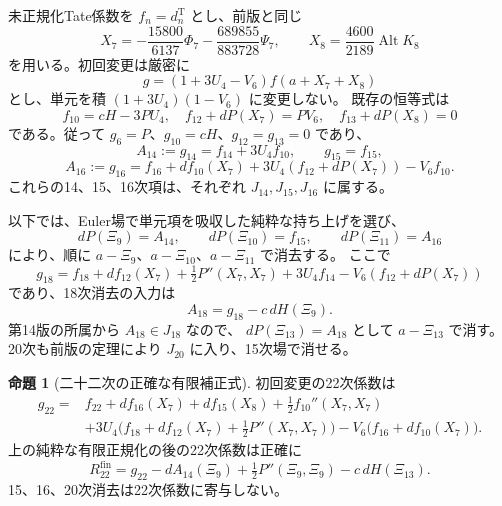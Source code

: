 \documentclass[a4paper,11pt]{ltjsarticle}
\theoremstyle{definition}
\newtheorem{proposition}[theorem]{命題}
\begin{document}
未正規化Tate係数を $f_n=d_n^{\mathrm T}$ とし、前版と同じ
\[
 X_7=-\frac{15800}{6137}\Phi_7-\frac{689855}{883728}\Psi_7,
 \qquad X_8=\frac{4600}{2189}\operatorname{Alt}K_8
\]
を用いる。初回変更は厳密に
\[
 g=(1+3U_4-V_6)f(a+X_7+X_8)
\]
とし、単元を積 $(1+3U_4)(1-V_6)$ に変更しない。
既存の恒等式は
\[
 f_{10}=cH-3PU_4,\quad
 f_{12}+dP(X_7)=PV_6,\quad f_{13}+dP(X_8)=0
\]
である。従って $g_6=P$、$g_{10}=cH$、$g_{12}=g_{13}=0$ であり、
\[
 A_{14}:=g_{14}=f_{14}+3U_4f_{10},\qquad g_{15}=f_{15},
\]
\[
 A_{16}:=g_{16}=f_{16}+df_{10}(X_7)
       +3U_4(f_{12}+dP(X_7))-V_6f_{10}.
\]
これらの14、15、16次項は、それぞれ $J_{14},J_{15},J_{16}$ に属する。

以下では、Euler場で単元項を吸収した純粋な持ち上げを選び、
\[
 dP(\Xi_9)=A_{14},\qquad dP(\Xi_{10})=f_{15},\qquad
 dP(\Xi_{11})=A_{16}
\]
により、順に $a-\Xi_9$、$a-\Xi_{10}$、$a-\Xi_{11}$ で消去する。
ここで
\[
 g_{18}=f_{18}+df_{12}(X_7)+\tfrac12P''(X_7,X_7)
           +3U_4f_{14}-V_6(f_{12}+dP(X_7))
\]
であり、18次消去の入力は
\begin{equation}\label{eq:v16-eighteenth-normalizer-input}
 A_{18}=g_{18}-c\,dH(\Xi_9).
\end{equation}
第14版の所属から $A_{18}\in J_{18}$ なので、
$dP(\Xi_{13})=A_{18}$ として $a-\Xi_{13}$ で消す。
20次も前版の定理により $J_{20}$ に入り、15次場で消せる。

\begin{proposition}[二十二次の正確な有限補正式]
\label{prop:v16-exact-twenty-second-correction}
初回変更の22次係数は
\begin{equation}\label{eq:v16-initial-twenty-second}
\begin{split}
 g_{22}={}&f_{22}+df_{16}(X_7)+df_{15}(X_8)
                +\tfrac12 f_{10}''(X_7,X_7)\\
 &+3U_4\bigl(f_{18}+df_{12}(X_7)+\tfrac12P''(X_7,X_7)\bigr)
             -V_6\bigl(f_{16}+df_{10}(X_7)\bigr).
\end{split}
\end{equation}
上の純粋な有限正規化の後の22次係数は正確に
\begin{equation}\label{eq:v16-exact-twenty-second}
 R_{22}^{\mathrm{fin}}
 =g_{22}-dA_{14}(\Xi_9)+\tfrac12P''(\Xi_9,\Xi_9)
                         -c\,dH(\Xi_{13}).
\end{equation}
15、16、20次消去は22次係数に寄与しない。
\end{proposition}
\end{document}
